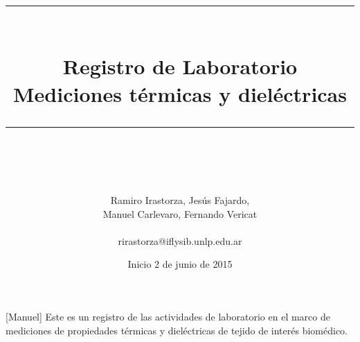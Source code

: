 \documentclass[idxtotoc,hyperref,openany]{labbook} %
\newcommand{\HRule}{\rule{\linewidth}{0.5mm}} %
\begin{document}

\frontmatter %
\title{
\begin{center}
\HRule \\[0.4cm]
{\Huge \bfseries Registro de Laboratorio \\[0.5cm] \Large Mediciones térmicas y dieléctricas}\\[0.4cm] %
\HRule \\[1.5cm]
\end{center}
}
\author{\Huge Ramiro Irastorza, Jesús Fajardo, \\[0.5cm] \Huge Manuel Carlevaro, Fernando Vericat \\ \\ \LARGE rirastorza@iflysib.unlp.edu.ar \\[2cm]} %
\date{Inicio 2 de junio de 2015} %
\maketitle

\tableofcontents

\mainmatter %









 [Manuel]
Este es un registro de las actividades de laboratorio en el marco de mediciones de propiedades térmicas y dieléctricas de tejido de interés biomédico.
\end{document}
